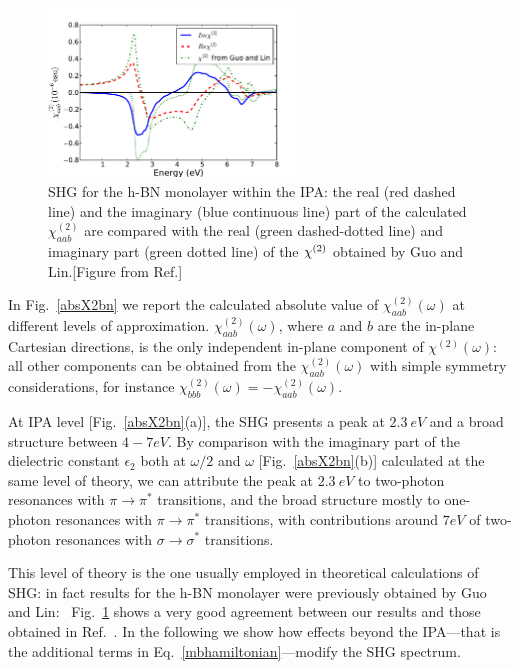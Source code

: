 \begin{figure}[h]
\centering
\includegraphics[width=0.6\textwidth]{Figures/IPX2}
\caption{\footnotesize{SHG for the h-BN monolayer within the IPA: the real (red dashed line) and the imaginary (blue continuous line) part of the calculated $\chi^{(2)}_{aab}$ are compared with the real (green dashed-dotted line) and imaginary part (green dotted line) of the $\chi^{(2)}$ obtained by Guo and Lin.\cite{guo2005second}[Figure from Ref.\cite{PhysRevB.89.081102}]}\label{X2bn}}
\end{figure}
In Fig.~\ref{absX2bn} we report the calculated absolute value of $\chi^{(2)}_{aab} (\omega)$ at different levels of approximation. $\chi^{(2)}_{aab} (\omega)$, where $a$ and $b$ are the in-plane Cartesian directions, is the only independent in-plane component of $\chi^{(2)} (\omega)$: all other components can be obtained from the $\chi^{(2)}_{aab} (\omega)$ with simple symmetry considerations, for instance $\chi^{(2)}_{bbb} (\omega)=-\chi^{(2)}_{aab} (\omega)$. 

At IPA level [Fig.~\ref{absX2bn}(a)], the SHG presents a peak at $2.3~eV$ and a broad structure between $4 - 7 eV$. By comparison with the imaginary part of the dielectric constant $\epsilon_2$ both at $\omega/2$ and  $\omega$ [Fig.~\ref{absX2bn}(b)] calculated at the same level of theory, we can attribute the peak at $2.3~eV$ to two-photon resonances with $\pi \to \pi^*$ transitions, and the broad structure mostly to one-photon resonances with $\pi \to \pi^*$ transitions, with contributions around $7 eV$ of two-photon resonances with $\sigma \to \sigma^*$ transitions.

 


This level of theory is the one usually employed in theoretical calculations of SHG: in fact results for the h-BN monolayer were previously obtained by Guo and Lin:~\cite{guo2005second} Fig.~\ref{X2bn} shows a very good agreement between our results and those obtained in Ref.~\cite{guo2005second}. In the following we show how effects beyond the IPA---that is the additional terms in Eq.~\eqref{mbhamiltonian}---modify the SHG spectrum.        


